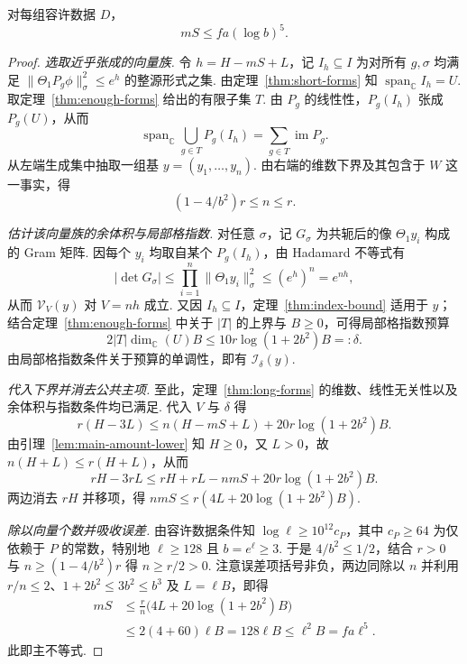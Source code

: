 \begin{theorem}[主不等式]
\label{thm:star}
\emitthmsource
对每组容许数据 $D$，
\begin{equation}
  mS\le fa(\log b)^5.
\tag{$\star$}\label{eq:ch1-star}
\end{equation}
\end{theorem}
\begin{proof}
\emph{选取近乎张成的向量族.}
令 $h=H-mS+L$，记 $I_h\subseteq I$ 为对所有 $g,\sigma$ 均满足 $\|\Theta_1P_g\phi\|_\sigma^2\le e^h$ 的整源形式之集. 由定理~\ref{thm:short-forms} 知 $\operatorname{span}_{\mathbb C} I_h=U$. 取定理~\ref{thm:enough-forms} 给出的有限子集 $T$. 由 $P_g$ 的线性性，$P_g(I_h)$ 张成 $P_g(U)$，从而
\[
 \operatorname{span}_{\mathbb C}\bigcup_{g\in T}P_g(I_h)
 =\sum_{g\in T}\operatorname{im}P_g.
\]
从左端生成集中抽取一组基 $y=(y_1,\ldots,y_n)$. 由右端的维数下界及其包含于 $W$ 这一事实，得
\[
 (1-4/b^2)r\le n\le r.
\]

\emph{估计该向量族的余体积与局部格指数.}
对任意 $\sigma$，记 $G_\sigma$ 为共轭后的像 $\Theta_1y_i$ 构成的 Gram 矩阵. 因每个 $y_i$ 均取自某个 $P_g(I_h)$，由 Hadamard 不等式有
\[
 |\det G_\sigma|\le\prod_{i=1}^{n}\|\Theta_1y_i\|^2_\sigma
 \le(e^h)^n=e^{nh},
\]
从而 $\mathcal V_V(y)$ 对 $V=nh$ 成立. 又因 $I_h\subseteq I$，定理~\ref{thm:index-bound} 适用于 $y$；结合定理~\ref{thm:enough-forms} 中关于 $|T|$ 的上界与 $B\ge0$，可得局部格指数预算
\[
 2|T|\dim_{\mathbb C}(U)B\le 10r\log(1+2b^2)B=:\delta.
\]
由局部格指数条件关于预算的单调性，即有 $\mathcal I_\delta(y)$.

\emph{代入下界并消去公共主项.}
至此，定理~\ref{thm:long-forms} 的维数、线性无关性以及余体积与指数条件均已满足. 代入 $V$ 与 $\delta$ 得
\[
 r(H-3L)\le n(H-mS+L)+20r\log(1+2b^2)B.
\]
由引理~\ref{lem:main-amount-lower} 知 $H\ge0$，又 $L>0$，故 $n(H+L)\le r(H+L)$，从而
\[
 rH-3rL\le rH+rL-nmS+20r\log(1+2b^2)B.
\]
两边消去 $rH$ 并移项，得 $nmS\le r(4L+20\log(1+2b^2)B)$.

\emph{除以向量个数并吸收误差.}
由容许数据条件知 $\log\ell\ge 10^{12}c_P$，其中 $c_P\ge64$ 为仅依赖于 $P$ 的常数，特别地 $\ell\ge128$ 且 $b=e^\ell\ge3$. 于是 $4/b^2\le1/2$，结合 $r>0$ 与 $n\ge(1-4/b^2)r$ 得 $n\ge r/2>0$. 注意误差项括号非负，两边同除以 $n$ 并利用 $r/n\le2$、$1+2b^2\le3b^2\le b^3$ 及 $L=\ell B$，即得
\[
\begin{aligned}
 mS &\le \frac rn\bigl(4L+20\log(1+2b^2)B\bigr)\\
    &\le 2(4+60)\ell B
     =128\ell B\le \ell^2B=fa\ell^5 .
\end{aligned}
\]
此即主不等式.
\end{proof}

